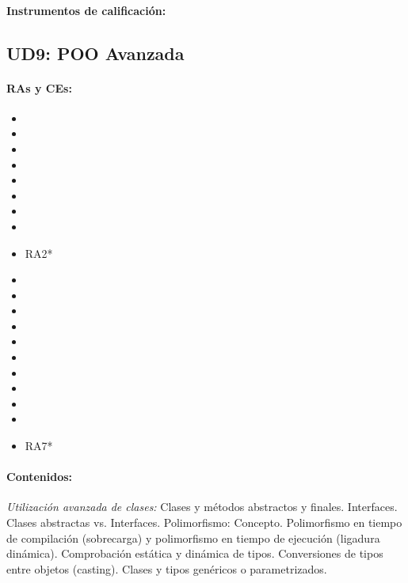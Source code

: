 	\paragraph{Instrumentos de calificación:}


\newpage
\subsection{UD9: POO Avanzada}

	\paragraph{RAs y CEs:}
	\begin{itemize}[itemsep=0.1em, topsep=0.1em]

		\item\RAUNOf
		\item\RAUNOi		
		\item\RATRESe
		\item\RATRESf
		\item\RATRESg
		\item\RACINCOa
		\item\RACINCOb
		\item\RACINCOc		
		\item RA2*
		\item\RACUATROa
		\item\RACUATROb
		\item\RACUATROc
		\item\RACUATROd
		\item\RACUATROe
		\item\RACUATROf
		\item\RACUATROg
		\item\RACUATROh
		\item\RACUATROi
		\item\RASEISf
		\item RA7*
	\end{itemize}


	\paragraph{Contenidos:}
		\emph{Utilización avanzada de clases:}
		Clases y métodos abstractos y finales.
		Interfaces. Clases abstractas vs. Interfaces.
		Polimorfismo: Concepto.  Polimorfismo en tiempo de compilación (sobrecarga) y polimorfismo en tiempo de ejecución (ligadura dinámica).  Comprobación estática y dinámica de tipos.
		Conversiones de tipos entre objetos (casting).
		Clases y tipos genéricos o parametrizados.

